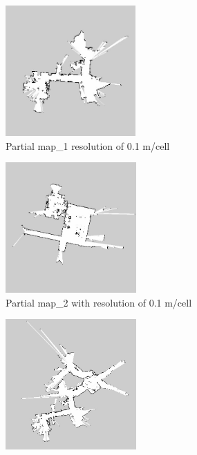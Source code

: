 \begin{figure}[H]
\begin{subfigure}{0.5\textwidth}
\includegraphics[width=0.9\linewidth, height=5cm]{figs/mit_results/a/partial_map_1.jpg}
\caption{Partial map\_1 resolution of 0.1 m/cell}
\label{fig:mit11}
\end{subfigure}
\begin{subfigure}{0.5\textwidth}
\includegraphics[width=0.9\linewidth, height=5cm]{figs/mit_results/a/partial_map_2.jpg} 
\caption{Partial map\_2 with resolution of 0.1 m/cell}
\label{fig:mit12}
\end{subfigure}
\begin{subfigure}{0.5\textwidth}
\includegraphics[width=0.9\linewidth, height=5cm]{figs/mit_results/a/partial_map_3.jpg} 

\end{subfigure}
\end{figure}
